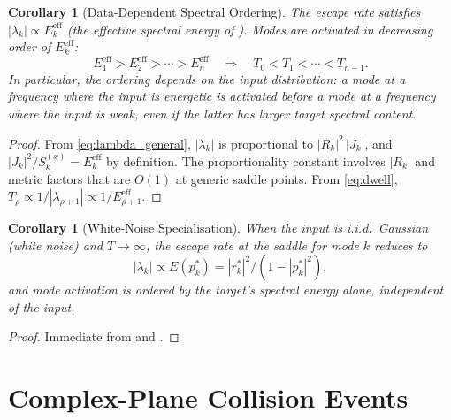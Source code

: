 \documentclass[11pt,a4paper]{article}
\newtheorem{corollary}[theorem]{Corollary}
\theoremstyle{definition}
\begin{document}
\begin{corollary}[Data-Dependent Spectral Ordering]%
\label{cor:ordering}
The escape rate satisfies
$|\lambda_k| \propto E_k^{\mathrm{eff}}$
(the effective spectral energy of ).
Modes are activated in decreasing order of
$E_k^{\mathrm{eff}}$:
\begin{equation}\label{eq:ordering}
  E_1^{\mathrm{eff}} > E_2^{\mathrm{eff}} > \cdots >
  E_n^{\mathrm{eff}}
  \quad\Longrightarrow\quad
  T_0 < T_1 < \cdots < T_{n-1}.
\end{equation}
In particular, the ordering depends on the input distribution:
a mode at a frequency where the input is energetic is activated
before a mode at a frequency where the input is weak, even if
the latter has larger target spectral content.
\end{corollary}

\begin{proof}
From \eqref{eq:lambda_general}, $|\lambda_k|$ is proportional to
$|R_k|^2\,|J_k|$, and
$|J_k|^2/S_k^{(x)} = E_k^{\mathrm{eff}}$ by definition.
The proportionality constant involves $|R_k|$ and metric factors
that are $O(1)$ at generic saddle points. From \eqref{eq:dwell},
$T_\rho \propto 1/|\lambda_{\rho+1}| \propto 1/E_{\rho+1}^{\mathrm{eff}}$.
\end{proof}

\begin{corollary}[White-Noise Specialisation]\label{cor:white}
When the input is i.i.d.\ Gaussian (white noise) and
$T \to \infty$, the escape rate at the saddle for mode $k$
reduces to
\begin{equation}
  |\lambda_k| \propto E(p_k^*) = |r_k^*|^2 / (1-|p_k^*|^2),
\end{equation}
and mode activation is ordered by the target's spectral energy
alone, independent of the input.
\end{corollary}

\begin{proof}
Immediate from  and
.
\end{proof}

\section{Complex-Plane Collision Events}\label{sec:collisions}
\end{document}
